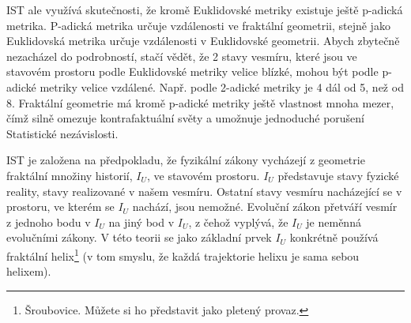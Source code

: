 IST ale využívá skutečnosti, že kromě Euklidovské metriky existuje ještě p-adická metrika. P-adická metrika určuje vzdálenosti ve fraktální geometrii, stejně jako Euklidovská metrika určuje vzdálenosti v Euklidovské geometrii. Abych zbytečně nezacházel do podrobností, stačí vědět, že 2 stavy vesmíru, které jsou ve stavovém prostoru podle Euklidovské metriky velice blízké, mohou být podle p-adické metriky velice vzdálené. Např. podle 2-adické metriky je 4 dál od 5, než od 8. Fraktální geometrie má kromě p-adické metriky ještě vlastnost mnoha mezer, čímž silně omezuje kontrafaktuální světy a umožnuje jednoduché porušení Statistické nezávislosti.

IST je založena na předpokladu, že fyzikální zákony vycházejí z geometrie fraktální množiny historií, $I_U$, ve stavovém prostoru. $I_U$ představuje stavy fyzické reality, stavy realizované v našem vesmíru. Ostatní stavy vesmíru nacházející se v prostoru, ve kterém se $I_U$ nachází, jsou nemožné. Evoluční zákon přetváří vesmír z jednoho bodu v $I_U$ na jiný bod v $I_U$, z čehož vyplývá, že $I_U$ je neměnná evolučními zákony. V této teorii se jako základní prvek $I_U$ konkrétně používá fraktální helix\footnote{Šroubovice. Můžete si ho představit jako pletený provaz.} (v tom smyslu, že každá trajektorie helixu je sama sebou helixem).
